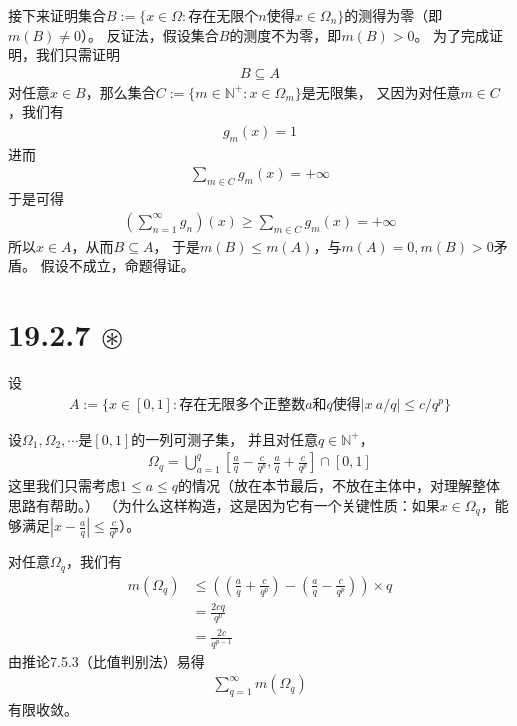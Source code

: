 \documentclass{article}
\begin{document}
接下来证明集合$B := \{x \in \Omega: \text{存在无限个$n$使得$x \in \Omega_n$}\}$的测得为零（即$m(B) \neq 0$）。
反证法，假设集合$B$的测度不为零，即$m(B) > 0$。
为了完成证明，我们只需证明
\begin{align*}
  B \subseteq A
\end{align*}
对任意$x \in B$，那么集合$C := \{m \in \mathbb{N}^+ : x \in \Omega_m\}$是无限集，
又因为对任意$m \in C$，我们有
\begin{align*}
  g_m(x) = 1
\end{align*}
进而
\begin{align*}
  \sum\limits_{m \in C} g_m(x) = +\infty
\end{align*}
于是可得
\begin{align*}
  \left(\sum \limits_{n = 1}^\infty g_n\right)(x) \geq \sum\limits_{m \in C} g_m(x) = +\infty
\end{align*}
所以$x \in A$，从而$B \subseteq A$，
于是$m(B) \leq m(A)$，与$m(A) = 0, m(B) > 0$矛盾。
假设不成立，命题得证。

\section*{19.2.7 $\circledast$}
设
\begin{align*}
  A := \{x \in [0, 1]: \text{存在无限多个正整数$a$和$q$使得$|x \ a/q| \leq c/q^p$}\}
\end{align*}

设$\Omega_1, \Omega_2, \cdots$是$[0, 1]$的一列可测子集，
并且对任意$q \in \mathbb{N}^+$，
\begin{align*}
  \Omega_q = \bigcup \limits_{a = 1}^q [\frac{a}{q} - \frac{c}{q^p}, \frac{a}{q} + \frac{c}{q^p}] \cap [0, 1]
\end{align*}
这里我们只需考虑$1 \leq a \leq q$的情况（放在本节最后，不放在主体中，对理解整体思路有帮助。）
（为什么这样构造，这是因为它有一个关键性质：如果$x \in \Omega_q$，能够满足$|x - \frac{a}{q}| \leq \frac{c}{q^p}$）。

对任意$\Omega_q$，我们有
\begin{align*}
  m(\Omega_q) & \leq ((\frac{a}{q} + \frac{c}{q^p}) - (\frac{a}{q} - \frac{c}{q^p})) \times q \\
              & = \frac{2cq}{q^p}                                                             \\
              & = \frac{2c}{q^{p - 1}}
\end{align*}
由推论7.5.3（比值判别法）易得
\begin{align*}
  \sum\limits_{q = 1}^\infty m(\Omega_q)
\end{align*}
有限收敛。
\end{document}
